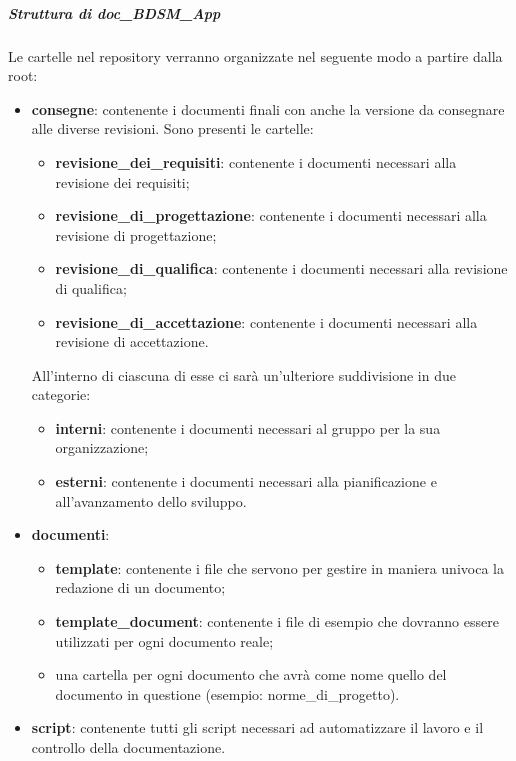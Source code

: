 				\subparagraph{Struttura di doc\_BDSM\_App}
				Le cartelle nel repository verranno organizzate nel seguente modo a partire dalla root:
					\begin{itemize}
						\item \textbf{consegne}: contenente i documenti finali con anche la versione da consegnare alle diverse revisioni. Sono presenti le cartelle:
							\begin{itemize}
								\item \textbf{revisione\_dei\_requisiti}: contenente i documenti necessari alla revisione dei requisiti;
								\item \textbf{revisione\_di\_progettazione}: contenente i documenti necessari alla revisione di progettazione;
								\item \textbf{revisione\_di\_qualifica}: contenente i documenti necessari alla revisione di qualifica;
								\item \textbf{revisione\_di\_accettazione}: contenente i documenti necessari alla revisione di accettazione.
							\end{itemize}
						\noindent
						All'interno di ciascuna di esse ci sarà un'ulteriore suddivisione in due categorie:
							\begin{itemize}
								\item \textbf{interni}: contenente i documenti necessari al gruppo per la sua organizzazione;
								\item \textbf{esterni}: contenente i documenti necessari alla pianificazione e all'avanzamento dello sviluppo.
							\end{itemize}
							
						\item \textbf{documenti}:
							\begin{itemize}
								\item \textbf{template}: contenente i file che servono per gestire in maniera univoca la redazione di un documento;
								\item \textbf{template\_document}: contenente i file di esempio che dovranno essere utilizzati per ogni documento reale;
								\item una cartella per ogni documento che avrà come nome quello del documento in questione (esempio: norme\_di\_progetto).
							\end{itemize}
							
						\item \textbf{script}: contenente tutti gli script necessari ad automatizzare il lavoro e il controllo della documentazione.
					\end{itemize}
					
